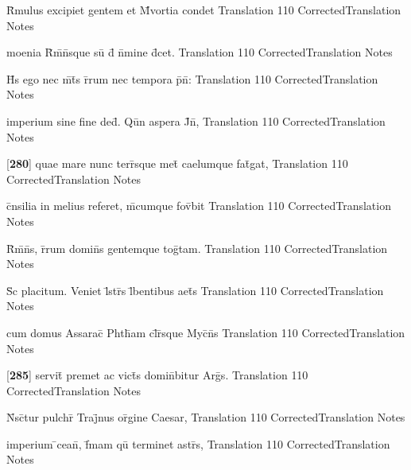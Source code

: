 \documentclass[]{book}
\begin{document}
\latline
  {R\={}mulus excipiet gentem et M\={}vortia condet}
  { Translation }
  {110}
  { CorrectedTranslation }
  { Notes }


\latline
  {moenia R\={}m\={}n\={}sque su\={} d\={} n\={}mine d\={\macron {\i}}cet.}
  { Translation }
  {110}
  { CorrectedTranslation }
  { Notes }


\latline
  {H\={\macron {\i}}s ego nec m\={}t\={}s r\={}rum nec tempora p\={}n\={}:}
  { Translation }
  {110}
  { CorrectedTranslation }
  { Notes }


\latline
  {imperium sine fine ded\={\macron {\i}}.  Qu\={\macron {\i}}n aspera J\={}n\={},}
  { Translation }
  {110}
  { CorrectedTranslation }
  { Notes }


\latline
  {[\textbf{280}] quae mare nunc terr\={}sque met\={} caelumque fat\={\macron {\i}}gat,}
  { Translation }
  {110}
  { CorrectedTranslation }
  { Notes }


\latline
  {c\={}nsilia in melius referet, m\={}cumque fov\={}bit}
  { Translation }
  {110}
  { CorrectedTranslation }
  { Notes }


\latline
  {R\={}m\={}n\={}s, r\={}rum domin\={}s gentemque tog\={}tam.}
  { Translation }
  {110}
  { CorrectedTranslation }
  { Notes }


\latline
  {S\={\macron {\i}}c placitum.  Veniet l\={}str\={\macron {\i}}s l\={}bentibus aet\={}s}
  { Translation }
  {110}
  { CorrectedTranslation }
  { Notes }


\latline
  {cum domus Assarac\={\macron {\i}} Phth\={\macron {\i}}am cl\={}r\={}sque Myc\={}n\={}s}
  { Translation }
  {110}
  { CorrectedTranslation }
  { Notes }


\latline
  {[\textbf{285}] servit\={} premet ac vict\={\macron {\i}}s domin\={}bitur Arg\={\macron {\i}}s.}
  { Translation }
  {110}
  { CorrectedTranslation }
  { Notes }


\latline
  {N\={}sc\={}tur pulchr\={} Traj\={}nus or\={\macron {\i}}gine Caesar,}
  { Translation }
  {110}
  { CorrectedTranslation }
  { Notes }


\latline
  {imperium \={}cean\={}, f\={}mam qu\={\macron {\i}} terminet astr\={\macron {\i}}s,}
  { Translation }
  {110}
  { CorrectedTranslation }
  { Notes }
\end{document}
